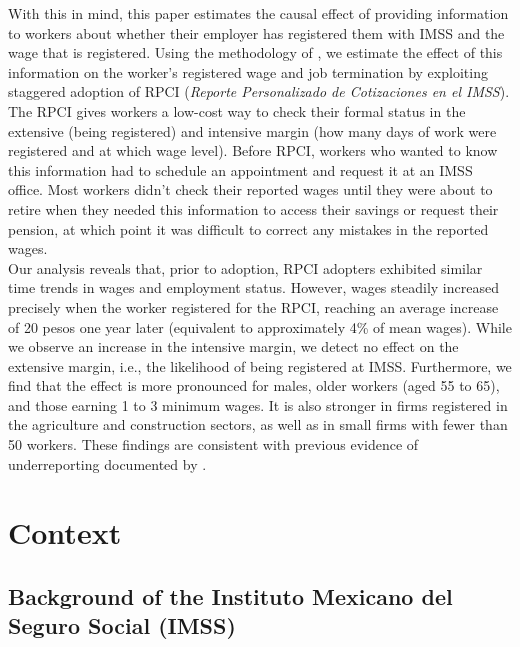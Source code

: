\documentclass[10pt, oneside]{book}
\begin{document}
With this in mind, this paper estimates the causal effect of providing information to workers about whether their employer has registered them with IMSS and the wage that is registered. Using the methodology of \cite{deChaisemartin2022}, we estimate the effect of this information on the worker's registered wage and job termination by exploiting staggered adoption of RPCI (\textit{Reporte Personalizado de Cotizaciones en el IMSS}). The RPCI gives workers a low-cost way to check their formal status in the extensive (being registered) and intensive margin (how many days of work were registered and at which wage level). Before RPCI, workers who wanted to know this information had to schedule an appointment and request it at an IMSS office. Most workers didn't check their reported wages until they were about to retire when they needed this information to access their savings or request their pension, at which point it was difficult to correct any mistakes in the reported wages. \\

Our analysis reveals that, prior to adoption, RPCI adopters exhibited similar time trends in wages and employment status. However, wages steadily increased precisely when the worker registered for the RPCI, reaching an average increase of 20 pesos one year later (equivalent to approximately 4\% of mean wages). While we observe an increase in the intensive margin, we detect no effect on the extensive margin, i.e., the likelihood of being registered at IMSS. Furthermore, we find that the effect is more pronounced for males, older workers (aged 55 to 65), and those earning 1 to 3 minimum wages. It is also stronger in firms registered in the agriculture and construction sectors, as well as in small firms with fewer than 50 workers. These findings are consistent with previous evidence of underreporting documented by \cite{kumler2020enlisting}. \\

\chapter{Context} \label{context}

\section{Background of the Instituto Mexicano del Seguro Social (IMSS)}
\end{document}
